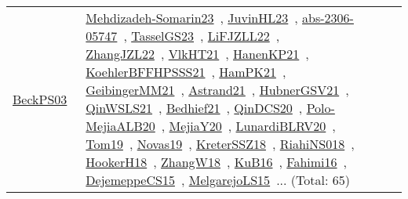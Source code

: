 {\begin{longtable}{lp{3cm}>{\raggedright\arraybackslash}p{6cm}>{\raggedright\arraybackslash}p{6cm}>{\raggedright\arraybackslash}p{8cm}}
\href{works/BeckPS03.pdf}{BeckPS03}~\cite{BeckPS03} & \href{works/Mehdizadeh-Somarin23.pdf}{Mehdizadeh-Somarin23}~\cite{Mehdizadeh-Somarin23}, \href{works/JuvinHL23.pdf}{JuvinHL23}~\cite{JuvinHL23}, \href{works/abs-2306-05747.pdf}{abs-2306-05747}~\cite{abs-2306-05747}, \href{works/TasselGS23.pdf}{TasselGS23}~\cite{TasselGS23}, \href{works/LiFJZLL22.pdf}{LiFJZLL22}~\cite{LiFJZLL22}, \href{works/ZhangJZL22.pdf}{ZhangJZL22}~\cite{ZhangJZL22}, \href{works/VlkHT21.pdf}{VlkHT21}~\cite{VlkHT21}, \href{works/HanenKP21.pdf}{HanenKP21}~\cite{HanenKP21}, \href{works/KoehlerBFFHPSSS21.pdf}{KoehlerBFFHPSSS21}~\cite{KoehlerBFFHPSSS21}, \href{works/HamPK21.pdf}{HamPK21}~\cite{HamPK21}, \href{works/GeibingerMM21.pdf}{GeibingerMM21}~\cite{GeibingerMM21}, \href{works/Astrand21.pdf}{Astrand21}~\cite{Astrand21}, \href{works/HubnerGSV21.pdf}{HubnerGSV21}~\cite{HubnerGSV21}, \href{works/QinWSLS21.pdf}{QinWSLS21}~\cite{QinWSLS21}, \href{works/Bedhief21.pdf}{Bedhief21}~\cite{Bedhief21}, \href{works/QinDCS20.pdf}{QinDCS20}~\cite{QinDCS20}, \href{works/Polo-MejiaALB20.pdf}{Polo-MejiaALB20}~\cite{Polo-MejiaALB20}, \href{works/MejiaY20.pdf}{MejiaY20}~\cite{MejiaY20}, \href{works/LunardiBLRV20.pdf}{LunardiBLRV20}~\cite{LunardiBLRV20}, \href{works/Tom19.pdf}{Tom19}~\cite{Tom19}, \href{works/Novas19.pdf}{Novas19}~\cite{Novas19}, \href{works/KreterSSZ18.pdf}{KreterSSZ18}~\cite{KreterSSZ18}, \href{works/RiahiNS018.pdf}{RiahiNS018}~\cite{RiahiNS018}, \href{works/HookerH18.pdf}{HookerH18}~\cite{HookerH18}, \href{works/ZhangW18.pdf}{ZhangW18}~\cite{ZhangW18}, \href{works/KuB16.pdf}{KuB16}~\cite{KuB16}, \href{works/Fahimi16.pdf}{Fahimi16}~\cite{Fahimi16}, \href{works/DejemeppeCS15.pdf}{DejemeppeCS15}~\cite{DejemeppeCS15}, \href{works/MelgarejoLS15.pdf}{MelgarejoLS15}~\cite{MelgarejoLS15}... (Total: 65)\\

\end{longtable}}
